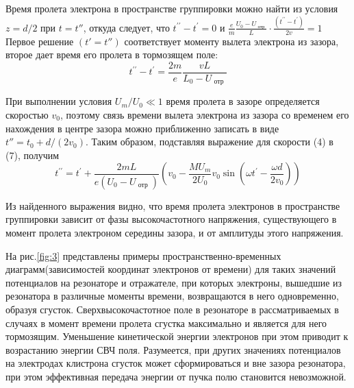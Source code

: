 Время пролета электрона в пространстве группировки можно найти из условия $z = d / 2$ при $t=t''$, откуда следует, что 
$t ^ { \prime \prime } - t ^ { \prime } = 0$ и 
$\frac { e } { m } \frac { U _ { 0 } - U _ { \text { отр } } } { L }\cdot \frac { \left( t ^ { \prime \prime } - t ^ { \prime } \right) } { 2 v } = 1$
Первое решение $(t' = t'' )$ соответствует моменту вылета электрона из зазора, второе дает время его пролета в тормозящем поле:
\begin{equation}
	t ^ { \prime \prime } - t ^ { \prime } = \frac { 2 m } { e } \frac { v L } { L _ { 0 } - U _ { \text { отр } } }
\end{equation}

При выполнении условия $U_{ m } / U _{ 0 } \ll 1$ время пролета в зазоре определяется скоростью $v_0$, поэтому связь времени вылета электрона из зазора со временем его нахождения в центре зазора можно приближенно записать в виде
$t'' = t _ { 0 } + d / \left( 2 v _ { 0 } \right)$. Таким образом, подставляя выражение для скорости (4) в (7), получим
\begin{equation}
	t ^ { \prime \prime } = t ^ { \prime } + \frac { 2 m L } { e \left( U _ { 0 } - U _ { \text { отр } } \right) } \left( v _ { 0 } - \frac { M U _ { m } } { 2 U _ { 0 } } v _ { 0 } \sin \left( \omega t ^ { \prime } - \frac { \omega d } { 2 v _ { 0 } } \right) \right)
\end{equation}

Из найденного выражения видно, что время пролета электронов в пространстве группировки зависит от фазы высокочастотного напряжения, существующего в момент пролета электроном середины зазора, и от амплитуды этого напряжения.

На рис.\ref{fig:3} представлены примеры пространственно-временных диаграмм(зависимостей координат электронов от времени) для таких значений потенциалов на резонаторе и отражателе, при которых электроны, вышедшие из резонатора в различные моменты времени, возвращаются в него одновремен­но, образуя сгусток. Сверхвысокочастотное поле в резонаторе в рассматриваемых в случаях в момент времени пролета сгустка максимально и является для него тормозящим. Уменьшение кинетической энергии электронов при этом приводит к возрастанию энергии СВЧ поля. Разумеется, при других значениях потенциалов на электродах клистрона сгусток может сформироваться и вне зазора резонатора, при этом эффективная передача энергии от пучка полю становится невозможной.

